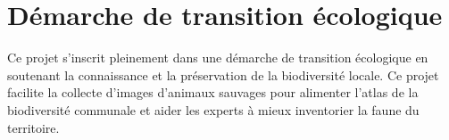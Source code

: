 \section{Démarche de transition écologique}

Ce projet s’inscrit pleinement dans une démarche de transition écologique en soutenant la connaissance et 
la préservation de la biodiversité locale. Ce projet facilite la collecte d’images d’animaux sauvages pour 
alimenter l’atlas de la biodiversité communale et aider les experts à mieux inventorier la faune du territoire.
